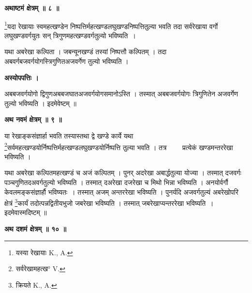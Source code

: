 \documentclass[11pt, openany]{book}
\begin{document}
\begin{center}
\textbf{\large अथाष्टमं क्षेत्रम् ॥ ८ ॥ }
\end{center}

{\ab \renewcommand{\thefootnote}{४}\footnote{यस्या रेखायाः {\en K., A.}}यदा रेखायाः स्वमहत्खण्डेन निष्पत्तिर्महत्खण्डलघुखण्डनिष्पत्तितुल्या भवति तदा सर्वरेखाया वर्गो लघुखण्डवर्गयुतः सन् त्रिगुणमहत्खण्डवर्गतुल्यो भविष्यति~। }\\
\vspace{3mm}


यथा अबरेखा कल्पिता । जबन्यूनखण्डं तस्यां निष्पत्तौ कल्पितम् । तदा अबवर्गबजवर्गयोगस्त्रिगुणितअजवर्गेण तुल्यो भविष्यति । 

\newpage
\begin{center}  
\textbf{अस्योपपत्तिः । }
\end{center}
\vspace{3mm}

अबबजवर्गयोगो द्विगुणअबबजघातअजवर्गयोगसमानोऽस्ति ।
तस्मात् अबबजवर्गयोगः त्रिगुणितेन अजवर्गेण तुल्यो भविष्यति ।
इदमेवेष्टम् ॥ \\
\vspace{3mm}

\begin{center}
\textbf{\large अथ नवमं क्षेत्रम् ॥ ९ ॥ }
\end{center}
\vspace{5mm}

\begin{sloppypar}
{\ab या रेखाङ्कसंज्ञार्हा भवति तस्यास्तथा द्वे खण्डे कार्ये यथा \renewcommand{\thefootnote}{१}\footnote{ सर्वरेखामहत्ख° {\en V.} }सर्वमहत्खण्डयोर्निष्पत्तिर्महत्खण्डलघुखण्डयोर्निष्पत्ति तुल्या भवति । तत्र ~~~~प्रत्येकं खण्डमन्तररेखा भविष्यति । }\\
\end{sloppypar}
\vspace{3mm}

 यथा अबरेखा कल्पितमहत्खण्डं च अजं कल्पितम् । पुनर् अदरेखा अबार्द्धतुल्या योज्या । तस्मात् दजवर्गः पञ्चगुणितदअवर्गतुल्यो भविष्यति । तस्मात् दअरेखा दजरेखा च मिथो भिन्ना भविष्यति । अनयोर्वर्गौ केवलमङ्कसंज्ञार्हौ भविष्यतः~। तस्मात् अजम् अन्तररेखा भविष्यति । पुनर्यदि अजवर्गतुल्यं अबरेखोपरि क्षेत्रं \renewcommand{\thefootnote}{२}\footnote{क्रियते {\en K., A.} }कार्यं तदोत्पन्नद्वितीयभुजो जबरेखा भविष्यति । तस्मात् जबरेखाप्यन्तररेखा भविष्यति~। इदमेवास्मदिष्टम् ॥ \\
 \vspace{3mm}
 
 \begin{center}
\textbf{\large अथ दशमं क्षेत्रम् ॥ १० ॥ }
\end{center}
\vspace{5mm}
\end{document}
